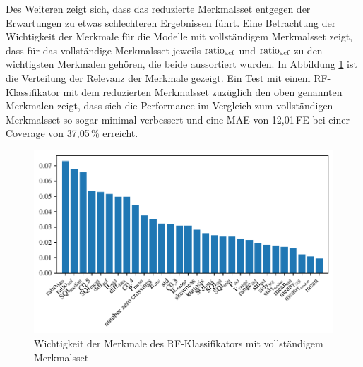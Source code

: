 Des Weiteren zeigt sich, dass das reduzierte Merkmalsset entgegen der Erwartungen zu etwas schlechteren Ergebnissen führt. Eine Betrachtung der Wichtigkeit der Merkmale für die Modelle mit vollständigem Merkmalsset zeigt, dass für das vollständige Merkmalsset jeweils $\text{ratio}\textsubscript{acf}$ und $\text{ratio}\textsubscript{acf}$ zu den wichtigsten Merkmalen gehören, die beide aussortiert wurden. In Abbildung \ref{fig:rf-clf-all-importances} ist die Verteilung der Relevanz der Merkmale gezeigt. Ein Test mit einem \ac{RF}-Klassifikator mit dem reduzierten Merkmalsset zuzüglich den oben genannten Merkmalen zeigt, dass sich die Performance im Vergleich zum vollständigen Merkmalsset so sogar minimal verbessert und eine \ac{MAE} von 12,01\,\si{FE} bei einer Coverage von 37,05\,\% erreicht.
\begin{figure}[h]
	\centering
	\includegraphics{pic/rf-clf-all-importances.pdf}
 	\caption{Wichtigkeit der Merkmale des \ac{RF}-Klassifikators mit vollständigem Merkmalsset}
 	\label{fig:rf-clf-all-importances}
\end{figure}

